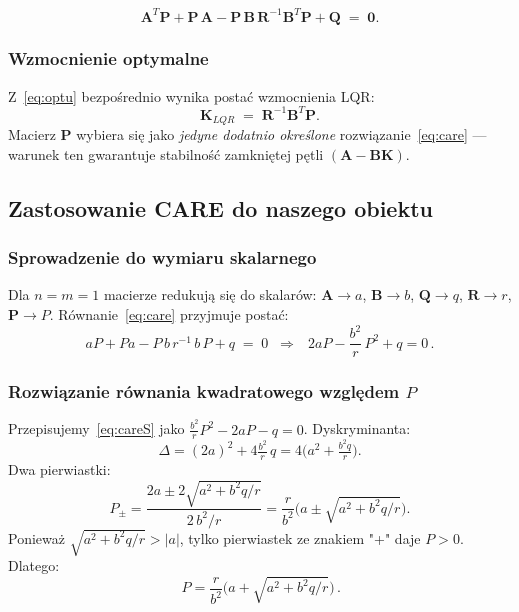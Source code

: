 \documentclass[11pt,a4paper]{article}
\begin{document}
\begin{wzor}[CARE]
\begin{equation}
\mathbf A^{T}\mathbf P + \mathbf P\,\mathbf A
- \mathbf P\,\mathbf B\,\mathbf R^{-1}\mathbf B^{T}\mathbf P
+ \mathbf Q \;=\; \mathbf 0.
\label{eq:care}
\end{equation}
\end{wzor}

\subsubsection*{Wzmocnienie optymalne}

Z~\eqref{eq:optu} bezpośrednio wynika postać wzmocnienia LQR:
\begin{equation}
\mathbf K_{LQR} \;=\; \mathbf R^{-1}\mathbf B^{T}\mathbf P.
\label{eq:Klqr}
\end{equation}
Macierz $\mathbf P$ wybiera się jako \emph{jedyne dodatnio określone}
rozwiązanie~\eqref{eq:care} --- warunek ten gwarantuje stabilność
zamkniętej pętli $(\mathbf A-\mathbf B\mathbf K)$.

\subsection{Zastosowanie CARE do naszego obiektu}

\subsubsection*{Sprowadzenie do wymiaru skalarnego}

Dla $n=m=1$ macierze redukują się do skalarów:
$\mathbf A\to a$, $\mathbf B\to b$, $\mathbf Q\to q$, $\mathbf R\to r$,
$\mathbf P\to P$. Równanie~\eqref{eq:care} przyjmuje postać:
\begin{equation}
a P + P a - P\,b\,r^{-1}\,b\,P + q \;=\; 0
\;\;\Longrightarrow\;\;
\boxed{\,2aP - \frac{b^{2}}{r}\,P^{2} + q = 0\,}.
\label{eq:careS}
\end{equation}

\subsubsection*{Rozwiązanie równania kwadratowego względem \texorpdfstring{$P$}{P}}

Przepisujemy~\eqref{eq:careS} jako $\tfrac{b^{2}}{r}P^{2} - 2aP - q = 0$.
Dyskryminanta:
\begin{equation}
\Delta = (2a)^{2} + 4\tfrac{b^{2}}{r}\,q = 4\Big(a^{2} + \tfrac{b^{2}q}{r}\Big).
\end{equation}
Dwa pierwiastki:
\begin{equation}
P_{\pm} = \frac{2a \pm 2\sqrt{a^{2} + b^{2}q/r}}{2\,b^{2}/r}
        = \frac{r}{b^{2}}\Big(a \pm \sqrt{a^{2} + b^{2}q/r}\Big).
\end{equation}
Ponieważ $\sqrt{a^{2}+b^{2}q/r} > |a|$, tylko pierwiastek ze znakiem
"+" daje $P>0$. Dlatego:
\begin{equation}
\boxed{\,P = \frac{r}{b^{2}}\Big(a + \sqrt{a^{2} + b^{2}q/r}\Big)\,}.
\end{equation}
\end{document}
